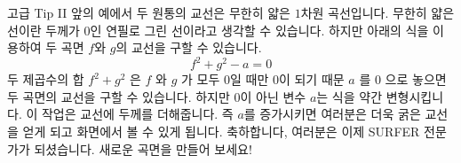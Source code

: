 \begin{surferPage}{고급 Tip II}
앞의 예에서 두 원통의 교선은 무한히 얇은 $1$차원 곡선입니다. 무한히 얇은 선이란 두께가 $0$인 연필로 그린 선이라고 생각할 수 있습니다. 하지만 아래의 식을 이용하여 두 곡면 $f$와 $g$의 교선을 구할 수 있습니다. 
\[ f^2+g^2-a=0\]
두 제곱수의 합 $f^2+g^2$ 은 $f$ 와 $g$ 가 모두 0일 때만 0이 되기 때문 $a$ 를 $0$ 으로 놓으면 두 곡면의 교선을 구할 수 있습니다. 하지만 0이 아닌 변수 $a$는 식을 약간 변형시킵니다. 이 작업은 교선에 두께를 더해줍니다. 즉 $a$를 증가시키면 여러분은 더욱 굵은 교선을 얻게 되고 화면에서 볼 수 있게 됩니다. 
\newline \newline
축하합니다, 여러분은 이제 SURFER 전문가가 되셨습니다. 새로운 곡면을 만들어 보세요!
\end{surferPage}
